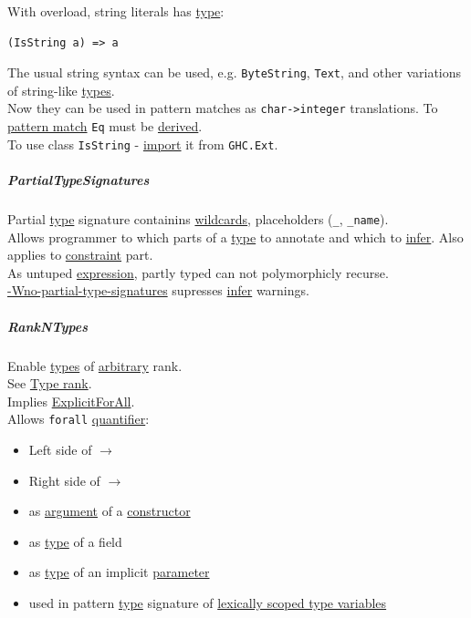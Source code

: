 \documentclass[11pt]{article}
\begin{document}
With overload, string literals has \hyperref[org4fbaeb8]{type}:\\
\begin{verbatim}
(IsString a) => a
\end{verbatim}

The usual string syntax can be used, e.g. \texttt{ByteString}, \texttt{Text}, and other variations of string-like \hyperref[org3927fd9]{types}.\\
Now they can be used in pattern matches as \texttt{char->integer} translations. To \hyperref[org6cd4afa]{pattern match} \texttt{Eq} must be \hyperref[org0c133f8]{derived}.\\

To use class \texttt{IsString} - \hyperref[org7d67aa0]{import} it from \texttt{GHC.Ext}.\\

\subparagraph{\label{orgdcbb3d1}PartialTypeSignatures}
\label{sec:org1dab92b}
Partial \hyperref[org4fbaeb8]{type} signature containins \hyperref[org76ccb11]{wildcards}, placeholders (\texttt{\_}, \texttt{\_name}).\\
Allows programmer to which parts of a \hyperref[org4fbaeb8]{type} to annotate and which to \hyperref[org774bd97]{infer}. Also applies to \hyperref[org7bec652]{constraint} part.\\

As untuped \hyperref[org667db83]{expression}, partly typed can not polymorphicly recurse.\\

\hyperref[orgfb5f538]{-Wno-partial-type-signatures} supresses \hyperref[org774bd97]{infer} warnings.\\

\subparagraph{\label{org52ee511}RankNTypes}
\label{sec:org619d0d9}
Enable \hyperref[org3927fd9]{types} of \hyperref[orgbfdf9b7]{arbitrary} rank.\\
See \hyperref[org8caa08c]{Type rank}.\\

Implies \hyperref[org7f703ef]{ExplicitForAll}.\\

Allows \texttt{forall} \hyperref[org7158dde]{quantifier}:\\
\begin{itemize}
\item Left side of \(\to\)\\
\item Right side of \(\to\)\\
\item as \hyperref[orgf66a5f7]{argument} of a \hyperref[orgd019743]{constructor}\\
\item as \hyperref[org4fbaeb8]{type} of a field\\
\item as \hyperref[org4fbaeb8]{type} of an implicit \hyperref[org45d4a16]{parameter}\\
\item used in pattern \hyperref[org4fbaeb8]{type} signature of \hyperref[orgfa2ba3c]{lexically scoped type variables}\\
\end{itemize}
\end{document}
